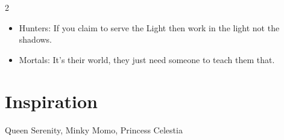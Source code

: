 \begin{multicols}{2}
\begin{itemize}
\item Hunters: If you claim to serve the Light then work in the light not the shadows.
\item Mortals: It's their world, they just need someone to teach them that.
\end{itemize}

\section*{Inspiration}
Queen Serenity, Minky Momo, Princess Celestia

\end{multicols}
